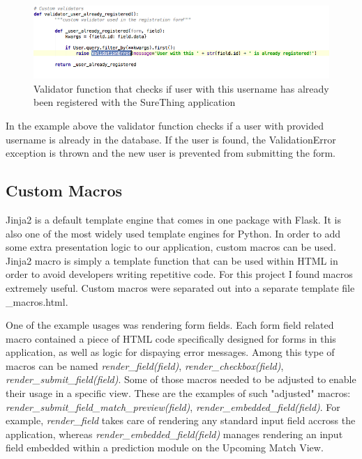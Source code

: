 \begin{figure}[H]
	\begin{center}
		\includegraphics[width=.90\linewidth,natwidth=610,natheight=642]{impl/images/customValidator}
		\caption{Validator function that checks if user with this username has already been registered with the SureThing application} \label{fig:using:customValidator}
	\end{center}
\end{figure}

In the example above the validator function checks if a user with provided username is already in the database. If the user is found, the ValidationError exception is thrown and the new user is prevented from submitting the form.

\subsection{Custom Macros}
Jinja2 is a default template engine that comes in one package with Flask. It is also one of the most widely used template engines for Python. In order to add some extra presentation logic to our application, custom macros can be used. Jinja2 macro is simply a template function that can be used within HTML in order to avoid developers writing repetitive code. For this project I found macros extremely useful. Custom macros were separated out into a separate template file \_macros.html.

One of the example usages was rendering form fields. Each form field related macro contained a piece of HTML code specifically designed for forms in this application, as well as logic for dispaying error messages. Among this type of macros can be named \emph{render\_field(field)}, \emph{render\_checkbox(field)}, \emph{render\_submit\_field(field)}. Some of those macros needed to be adjusted to enable their usage in a specific view. These are the examples of such "adjusted" macros: \emph{render\_submit\_field\_match\_preview(field)}, \emph{render\_embedded\_field(field)}. For example, \emph{render\_field} takes care of rendering any standard input field accross the application, whereas \emph{render\_embedded\_field(field)} manages rendering an input field embedded within a prediction module on the Upcoming Match View. 

